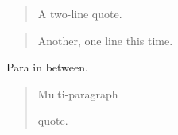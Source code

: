 \begin{quote}
A two-line
quote.
\end{quote}
\begin{quote}
Another, one line this time.
\end{quote}
Para in between.

\begin{quote}
Multi-paragraph

quote.
\end{quote}
